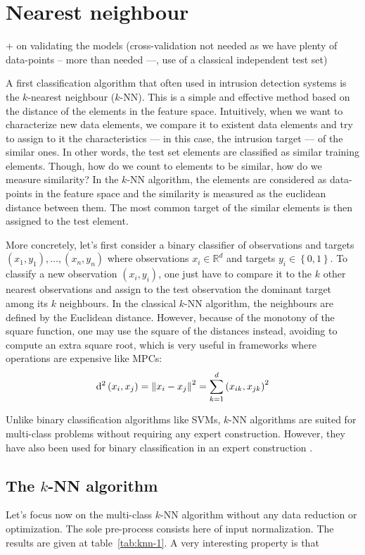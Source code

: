 \section{Nearest neighbour}
+ on validating the models (cross-validation not needed as we have plenty of data-points -- more than needed ---, use of a classical independent test set)

A first classification algorithm that often used in intrusion detection systems is the $k$-nearest neighbour ($k$-NN). This is a simple and effective method based on the distance of the elements in the feature space. Intuitively, when we want to characterize new data elements, we compare it to existent data elements and try to assign to it the characteristics --- in this case, the intrusion target --- of the similar ones. In other words, the test set elements are classified as similar training elements. Though, how do we count to elements to be similar, how do we measure similarity? In the $k$-NN algorithm, the elements are considered as data-points in the feature space and the similarity is measured as the euclidean distance between them. The most common target of the similar elements is then assigned to the test element.

More concretely, let's first consider a binary classifier of observations and targets $\left( x_1, y_1 \right), \ldots , \left( x_n, y_n \right)$ where observations $x_i \in \mathbb{R}^d$ and targets $y_i \in \left\{0,1\right\}$. To classify a new observation $\left( x_i, y_i \right)$, one just have to compare it to the $k$ other nearest observations and assign to the test observation the dominant target among its $k$ neighbours. In the classical $k$-NN algorithm, the neighbours are defined by the Euclidean distance. However, because of the monotony of the square function, one may use the square of the distances instead, avoiding to compute an extra square root, which is very useful in frameworks where operations are expensive like MPCs:
\begin{equation}
    \mathrm{d}^2\left( x_i, x_j \right) = \left\lVert x_i-x_j\right\rVert^2 = \sum_{k=1}^d \left( x_{ik}, x_{jk} \right)^2
\end{equation}

Unlike binary classification algorithms like SVMs, $k$-NN algorithms are suited for multi-class problems without requiring any expert construction. However, they have also been used for binary classification in an expert construction \cite{Aburomman2016ASystem}. 

\subsection{The $k$-NN algorithm}
Let's focus now on the multi-class $k$-NN algorithm without any data reduction or optimization. The sole pre-process consists here of input normalization. The results are given at table~\ref{tab:knn-1}. A very interesting property is that 

